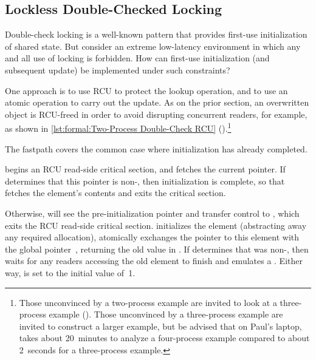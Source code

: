 \subsection{Lockless Double-Checked Locking}
\label{sec:together:Lockless Double-Checked Locking}

Double-check locking is a well-known pattern that provides first-use
initialization of shared state.
But consider an extreme low-latency environment in which any and all
use of locking is forbidden.
How can first-use initialization (and subsequent update) be implemented
under such constraints?

\begin{listing}
\caption{Two-Process Double-Check RCU}
\label{lst:formal:Two-Process Double-Check RCU}
\end{listing}

One approach is to use RCU to protect the lookup operation, and to use
an atomic  operation to carry out the update.
As on the prior section, an overwritten object is RCU-freed in order to
avoid disrupting concurrent readers, for example, as shown in
\cref{lst:formal:Two-Process Double-Check RCU}
().\footnote{
	Those unconvinced by a two-process example are invited to look
	at a three-process example
	().
	Those unconvinced by a three-process example are invited to
	construct a larger example, but be advised that on Paul's laptop,
	 takes about 20~minutes to analyze a four-process
	example compared to about 2~seconds for a three-process example.}

The fastpath covers the common case where initialization has already
completed.
\begin{fcvref}
 begins an RCU read-side critical section, and  fetches
the current pointer.
If  determines that this pointer is non-, then
initialization is complete, so that  fetches the element's contents
and  exits the critical section.

Otherwise,  will see the pre-initialization  pointer
and transfer control to , which exits the RCU read-side critical
section.
 initializes the element (abstracting away any required allocation),
 atomically exchanges the pointer to this element with the global
pointer~, returning the old value in .
If  determines that  was non-, then 
waits for any readers accessing the old element to finish and 
emulates a .
Either way,  is set to the initial value of~1.
\end{fcvref}

